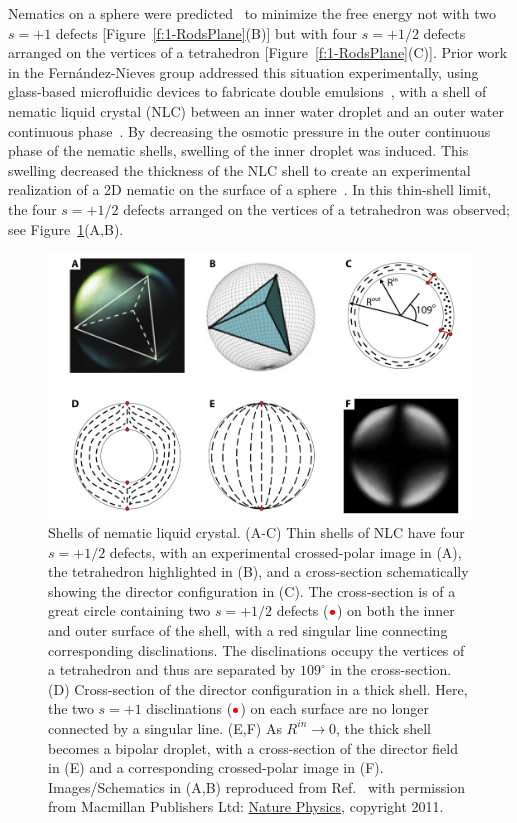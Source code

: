 Nematics on a sphere were predicted~\cite{RN42,RN104,RN43} to minimize the free energy not with two $s=+1$ defects [Figure~\ref{f:1-RodsPlane}(B)] but with four $s=+1/2$ defects arranged on the vertices of a tetrahedron [Figure~\ref{f:1-RodsPlane}(C)].
Prior work in the Fern\'andez-Nieves group addressed this situation experimentally, using glass-based microfluidic devices to fabricate double emulsions~\cite{RN272}, with a shell of nematic liquid crystal (NLC) between an inner water droplet and an outer water continuous phase~\cite{RN105,RN45}.
By decreasing the osmotic pressure in the outer continuous phase of the nematic shells, swelling of the inner droplet was induced.
This swelling decreased the thickness of the NLC shell to create an experimental realization of a 2D nematic on the surface of a sphere~\cite{RN45}.
In this thin-shell limit, the four $s = +1/2$ defects arranged on the vertices of a tetrahedron was observed; see Figure~\ref{f:1-Shells}(A,B).
\begin{figure}
  \centering
  \includegraphics{figures/C1/Ch1-Figs_Shells.png}
  \caption{Shells of nematic liquid crystal.
  (A-C) Thin shells of NLC have four $s = +1/2$ defects, with an experimental crossed-polar image in (A), the tetrahedron highlighted in (B), and a cross-section schematically showing the director configuration in (C).
  The cross-section is of a great circle containing two $s = +1/2$ defects (${\color{red} \bullet}$) on both the inner and outer surface of the shell, with a red singular line connecting corresponding disclinations.
  The disclinations occupy the vertices of a tetrahedron and thus are separated by $109^{\circ}$ in the cross-section.
  (D) Cross-section of the director configuration in a thick shell. Here, the two $s = +1$ disclinations (${\color{red} \bullet}$) on each surface are no longer connected by a singular line.
  (E,F) As $R^{in}\rightarrow 0$, the thick shell becomes a bipolar droplet, with a cross-section of the director field in (E) and a corresponding crossed-polar image in (F).
  Images/Schematics in (A,B) reproduced from Ref.~\cite{RN105} with permission from Macmillan Publishers Ltd: \href{https://www.nature.com/nphys/}{Nature Physics}, copyright 2011.}\label{f:1-Shells}
\end{figure}

